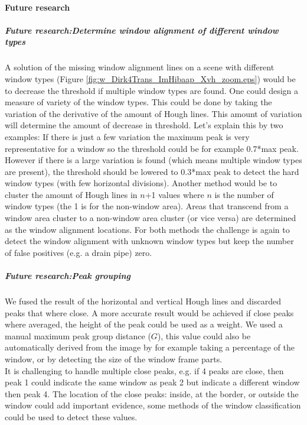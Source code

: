 \paragraph{Future research}
\subparagraph{Future research:Determine window alignment of different window types}
A solution of the missing window alignment lines on a scene with different
window types (Figure \ref{fig:w_Dirk4Trans_ImHibaap_Xvh_zoom.eps}) would be to
decrease the threshold if multiple window types are found. One could design a
measure of variety of the window types. This could be done by taking the variation of the
derivative of the amount of Hough lines. This amount of variation will determine
the amount of decrease in threshold. Let's explain this by two examples:
If there is just a few variation the maximum peak is very representative for a
window so the threshold could be for example 0.7*max peak. However if there is a
large variation is found (which means multiple window types are present), the
threshold should be lowered to 0.3*max peak to detect the hard window types
(with few horizontal divisions).
Another method would be to cluster the amount of Hough lines in $n$+1 values
where $n$ is the number of window types (the 1 is for the non-window area).
Areas that transcend from a window area cluster to a non-window area cluster
(or vice versa) are determined as the window alignment locations.
For both methods the challenge is again to detect the window alignment with
unknown window types but keep the number of false positives (e.g. a drain pipe)
zero.

\subparagraph{Future research:Peak grouping}
We fused the result of the horizontal and vertical Hough lines and discarded
peaks that where close.  A more accurate result would be achieved if close peaks
where averaged, the height of the peak could be used as a weight.  We used a
manual maximum peak group distance ($G$), this value could also be automatically
derived from the image by for example taking a percentage of the window, or by
detecting the size of the window frame parts.\\ It is challenging to handle
multiple close peaks, e.g. if 4 peaks are close, then peak 1 could indicate the
same window as peak 2 but indicate a different window then peak 4. The location
of the close peaks: inside, at the border, or outside the window could add
important evidence, some methods of the window classification could be used to
detect these values.

